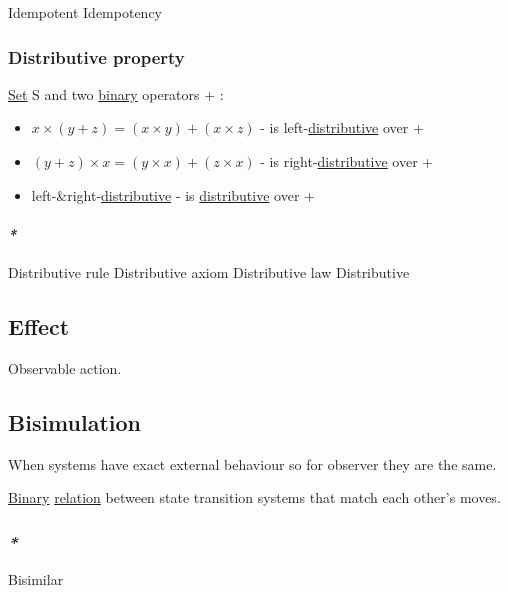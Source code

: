 \documentclass[a4paper,14pt,oneside]{book}
\begin{document}
\label{orgb06b10b}Idempotent
\label{orgfac1799}Idempotency

\subsubsection{\label{orgdd99a4a}Distributive property}
\label{sec:orgadde397}
\hyperref[org28abdc9]{Set} S and two \hyperref[org1e356fa]{binary} operators + \texttimes{}:

\begin{itemize}
\item \(x \times (y + z) = (x \times y) + (x \times z)\) - \texttimes{} is left-\hyperref[orgd7e7a7b]{distributive} over +
\item \((y + z) \times x = (y \times x) + (z \times x)\) - \texttimes{} is right-\hyperref[orgd7e7a7b]{distributive} over +
\item left-\&right-\hyperref[orgd7e7a7b]{distributive} - \texttimes{} is \hyperref[orgd7e7a7b]{distributive} over +
\end{itemize}

\paragraph{\emph{*}}
\label{sec:org489463b}

\label{org12ffd32}Distributive rule
\label{org5c5915e}Distributive axiom
\label{org2496e3b}Distributive law
\label{orgd7e7a7b}Distributive

\subsection{\label{orgc0cb4fc}Effect}
\label{sec:orgb05ce1f}
Observable action.

\subsection{\label{org3d60634}Bisimulation}
\label{sec:org75ce5c8}
When systems have exact external behaviour so for observer they are the same.

\hyperref[org1e356fa]{Binary} \hyperref[orgdeb75cd]{relation} between state transition systems that match each other's moves.

\subsubsection{\emph{*}}
\label{sec:orga73b5bd}

\label{orgdf0e70c}Bisimilar
\end{document}
